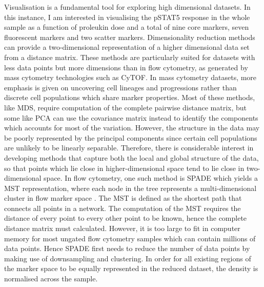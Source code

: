 Visualisation is a fundamental tool for exploring high dimensional datasets.
In this instance, I am interested in visualising the pSTAT5 response in the whole sample as a function of proleukin dose and a total of nine core markers, seven fluorescent markers and two scatter markers.
Dimensionality reduction methods can provide a two-dimensional representation of a higher dimensional data set from a distance matrix.
These methods are particularly suited for datasets with less data points but more dimensions than in flow cytometry,
as generated by mass cytometry technologies such as CyTOF.
In mass cytometry datasets, more emphasis is given on uncovering cell lineages and progressions rather than discrete cell populations which share marker
properties.
Most of these methods, like \gls{MDS}, require computation of the complete pairwise distance matrix,
but some like \gls{PCA} can use the covariance matrix instead to identify the components which accounts for most of the variation. 
However, the structure in the data may be poorly represented by the principal components since certain cell populations are unlikely to be linearly separable.
Therefore, there is considerable interest in developing methods that capture both the local and global structure of the data, so that points which lie close in higher-dimensional space tend to lie close in two-dimensional space.
In flow cytometry, one such method is \acrfull{SPADE} which yields a \acrfull{MST} representation, where each node in the tree represents a multi-dimensional cluster in flow marker space \citep{Simonds:2011jh}.
The \gls{MST} is defined as the shortest path that connects all points in a network.
The computation of the \gls{MST} requires the distance of every point to every other point to be known, hence the complete distance matrix must calculated.
However, it is too large to fit in computer memory for most ungated flow cytometry samples which can contain millions of data points.
Hence \gls{SPADE} first needs to reduce the number of data points by making use of downsampling and clustering.
In order for all existing regions of the marker space to be equally represented in the reduced dataset, the density is normalised across the sample.

